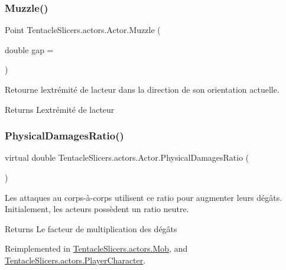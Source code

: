 \subsubsection{\texorpdfstring{Muzzle()}{Muzzle()}}
{\footnotesize\ttfamily Point Tentacle\+Slicers.\+actors.\+Actor.\+Muzzle (\begin{DoxyParamCaption}\item[{double}]{gap = {} }\end{DoxyParamCaption})}



Retourne l\textquotesingle{}extrémité de l\textquotesingle{}acteur dans la direction de son orientation actuelle. 

\begin{DoxyReturn}{Returns}
L\textquotesingle{}extrémité de l\textquotesingle{}acteur 
\end{DoxyReturn}
\mbox{\label{class_tentacle_slicers_1_1actors_1_1_actor_a8041088479e124a66c24d185f5385b2f}} 
\subsubsection{\texorpdfstring{Physical\+Damages\+Ratio()}{PhysicalDamagesRatio()}}
{\footnotesize\ttfamily virtual double Tentacle\+Slicers.\+actors.\+Actor.\+Physical\+Damages\+Ratio (\begin{DoxyParamCaption}{ }\end{DoxyParamCaption})\hspace{0.3cm}{\ttfamily [virtual]}}



Les attaques au corps-\/à-\/corps utilisent ce ratio pour augmenter leurs dégâts. Initialement, les acteurs possèdent un ratio neutre. 

\begin{DoxyReturn}{Returns}
Le facteur de multiplication des dégâts 
\end{DoxyReturn}


Reimplemented in \hyperlink{class_tentacle_slicers_1_1actors_1_1_mob_a9a27f7eb262346d1e1837df5316823f2}{Tentacle\+Slicers.\+actors.\+Mob}, and \hyperlink{class_tentacle_slicers_1_1actors_1_1_player_character_a1e6201247e550f29f061ac87c88c70f6}{Tentacle\+Slicers.\+actors.\+Player\+Character}.

